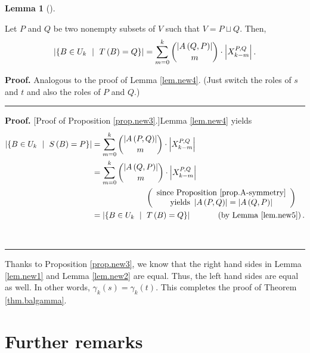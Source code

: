 \documentclass[numbers=enddot,12pt,final,onecolumn,notitlepage]{scrartcl}%
\theoremstyle{definition}
\newtheorem{lem}[theo]{Lemma}
\newenvironment{lemma}[1][]
{\begin{lem}[#1]\begin{leftbar}}
{\end{leftbar}\end{lem}}
\newenvironment{proof}[1][Proof]{\noindent\textbf{#1.} }{\ \rule{0.5em}{0.5em}}
\let\sumnonlimits\sum
\renewcommand{\sum}{\sumnonlimits\limits}
\theoremstyle{plainsl}
\begin{document}
\begin{lemma}
\label{lem.new5} Let $P$ and $Q$ be two nonempty subsets of $V$ such that
$V=P\sqcup Q$. Then,%
\[
\left\vert \left\{  B\in U_{k}\ \mid\ T\left(  B\right)  =Q\right\}
\right\vert =\sum_{m=0}^{k}\dbinom{\left\vert A\left(  Q,P\right)  \right\vert
}{m}\cdot\left\vert X_{k-m}^{P,Q}\right\vert .
\]

\end{lemma}

\begin{proof}
Analogous to the proof of Lemma \ref{lem.new4}. (Just switch the roles of $s$
and $t$ and also the roles of $P$ and $Q$.)
\end{proof}

\begin{proof}
[Proof of Proposition \ref{prop.new3}.]Lemma \ref{lem.new4} yields%
\begin{align*}
\left\vert \left\{  B\in U_{k}\ \mid\ S\left(  B\right)  =P\right\}
\right\vert  &  =\sum_{m=0}^{k}\dbinom{\left\vert A\left(  P,Q\right)
\right\vert }{m}\cdot\left\vert X_{k-m}^{P,Q}\right\vert \\
&  =\sum_{m=0}^{k}\dbinom{\left\vert A\left(  Q,P\right)  \right\vert }%
{m}\cdot\left\vert X_{k-m}^{P,Q}\right\vert \\
&  \ \ \ \ \ \ \ \ \ \ \ \ \ \ \ \ \ \ \ \ \left(
\begin{array}
[c]{c}%
\text{since Proposition \ref{prop.A-symmetry}}\\
\text{yields }\left\vert A\left(  P,Q\right)  \right\vert =\left\vert A\left(
Q,P\right)  \right\vert
\end{array}
\right) \\
&  =\left\vert \left\{  B\in U_{k}\ \mid\ T\left(  B\right)  =Q\right\}
\right\vert \ \ \ \ \ \ \ \ \ \ \left(  \text{by Lemma \ref{lem.new5}}\right)
.
\end{align*}

\end{proof}

Thanks to Proposition \ref{prop.new3}, we know that the right hand sides in
Lemma \ref{lem.new1} and Lemma \ref{lem.new2} are equal. Thus, the left hand
sides are equal as well. In other words, $\gamma_{k}\left(  s\right)
=\gamma_{k}\left(  t\right)  $. This completes the proof of Theorem
\ref{thm.balgamma}.

\section{Further remarks}
\end{document}

